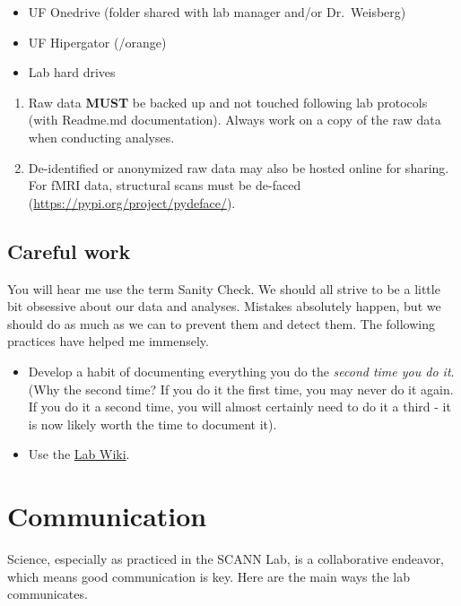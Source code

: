 \documentclass[
  12pt,
]{book}
\providecommand{\tightlist}{%
  \setlength{\itemsep}{0pt}\setlength{\parskip}{0pt}}
\begin{document}
\begin{itemize}
\tightlist
\item
  UF Onedrive (folder shared with lab manager and/or Dr.~Weisberg)
\item
  UF Hipergator (/orange)
\item
  Lab hard drives
\end{itemize}

\begin{enumerate}
\def\labelenumi{\arabic{enumi}.}
\setcounter{enumi}{1}
\item
  Raw data \textbf{MUST} be backed up and not touched following lab protocols (with Readme.md documentation). Always work on a copy of the raw data when conducting analyses.
\item
  De-identified or anonymized raw data may also be hosted online for sharing. For fMRI data, structural scans must be de-faced (\url{https://pypi.org/project/pydeface/}).
\end{enumerate}

\hypertarget{careful-work}{%
\section{Careful work}\label{careful-work}}

You will hear me use the term Sanity Check. We should all strive to be a little bit obsessive about our data and analyses. Mistakes absolutely happen, but we should do as much as we can to prevent them and detect them. The following practices have helped me immensely.

\begin{itemize}
\item
  Develop a habit of documenting everything you do the \emph{second time you do it}. (Why the second time? If you do it the first time, you may never do it again. If you do it a second time, you will almost certainly need to do it a third - it is now likely worth the time to document it).
\item
  Use the \href{https://osf.io/d8ke4/}{Lab Wiki}.
\end{itemize}

\hypertarget{communication}{%
\chapter{Communication}\label{communication}}

Science, especially as practiced in the SCANN Lab, is a collaborative endeavor, which means good communication is key. Here are the main ways the lab communicates.
\end{document}
